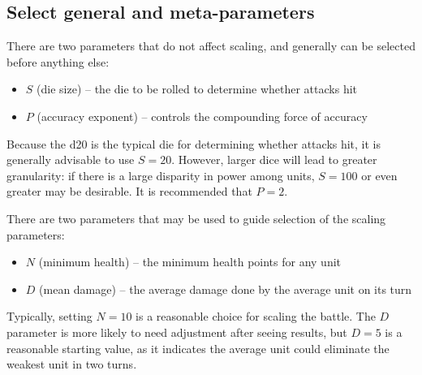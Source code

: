 \subsection{Select general and meta-parameters}

There are two parameters that do not affect scaling,
and generally can be selected before anything else:

\begin{itemize}
    \item $S$ (die size) -- the die to be rolled to determine whether attacks hit
    \item $P$ (accuracy exponent) -- controls the compounding force of accuracy
\end{itemize}

Because the d20 is the typical die for determining whether attacks hit,
it is generally advisable to use $S = 20$.
However, larger dice will lead to greater granularity:
if there is a large disparity in power among units,
$S = 100$ or even greater may be desirable.
It is recommended that $P = 2$.

There are two parameters that may be used to guide selection of the scaling parameters:

\begin{itemize}
    \item $N$ (minimum health) -- the minimum health points for any unit
    \item $D$ (mean damage) -- the average damage done by the average unit on its turn
\end{itemize}

Typically, setting $N = 10$ is a reasonable choice for scaling the battle.
The $D$ parameter is more likely to need adjustment after seeing results,
but $D = 5$ is a reasonable starting value,
as it indicates the average unit could eliminate the weakest unit in two turns.


